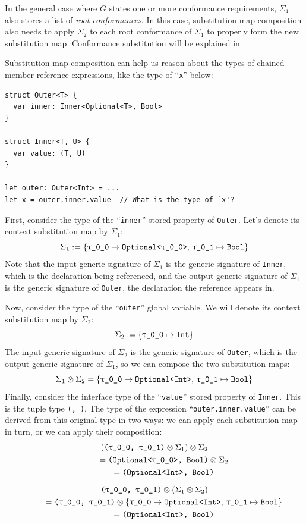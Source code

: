 \documentclass[../generics]{subfiles}
\begin{document}
In the general case where $G$ states one or more conformance requirements, $\Sigma_1$ also stores a list of \emph{root conformances}. In this case, substitution map composition also needs to apply $\Sigma_2$ to each root conformance of $\Sigma_1$ to properly form the new substitution map. Conformance substitution will be explained in .

\newcommand{\FirstMapInExample}{\SubstMap{
\SubstType{\rT}{Optional<\rT>},\,\SubstType{\rU}{Bool}
}}
\newcommand{\SecondMapInExample}{\SubstMap{
\SubstType{\rT}{Int}
}}
\newcommand{\ThirdMapInExample}{\SubstMap{
\SubstType{\rT}{Optional<Int>},\,\SubstType{\rU}{Bool}
}}

\begin{example}\label{composesubstmapexample}
Substitution map composition can help us reason about the types of chained member reference expressions, like the type of ``\texttt{x}'' below:
\begin{Verbatim}
struct Outer<T> {
  var inner: Inner<Optional<T>, Bool>
}

struct Inner<T, U> {
  var value: (T, U)
}

let outer: Outer<Int> = ...
let x = outer.inner.value  // What is the type of `x'?
\end{Verbatim}
First, consider the type of the ``\texttt{inner}'' stored property of \texttt{Outer}. Let's denote its context substitution map by $\Sigma_1$:
\[
\Sigma_1 := \FirstMapInExample
\]
Note that the input generic signature of $\Sigma_1$ is the generic signature of \texttt{Inner}, which is the declaration being referenced, and the output generic signature of $\Sigma_1$ is the generic signature of \texttt{Outer}, the declaration the reference appears in.

Now, consider the type of the ``\texttt{outer}'' global variable. We will denote its context substitution map by $\Sigma_2$:
\[
\Sigma_2 := \SecondMapInExample
\]
The input generic signature of $\Sigma_2$ is the generic signature of \texttt{Outer}, which is the output generic signature of $\Sigma_1$, so we can compose the two substitution maps:
\[\Sigma_1\otimes\Sigma_2 = \ThirdMapInExample\]
Finally, consider the interface type of the ``\texttt{value}'' stored property of \texttt{Inner}. This is the tuple type \texttt{(\rT, \rU)}. The type of the expression ``\texttt{outer.inner.value}'' can be derived from this original type in two ways: we can apply each substitution map in turn, or we can apply their composition:
\begin{gather*}
(\texttt{(\rT, \rU)}\otimes\Sigma_1)\otimes \Sigma_2\\
\qquad {} = \texttt{(Optional<\rT>, Bool)}\otimes \Sigma_2\\
\qquad {} = \texttt{(Optional<Int>, Bool)}\\[\medskipamount]
\texttt{(\rT, \rU)}\otimes(\Sigma_1\otimes \Sigma_2)\\
\qquad {} = \texttt{(\rT, \rU)}\otimes \ThirdMapInExample\\
\qquad {} = \texttt{(Optional<Int>, Bool)}
\end{gather*}
\end{example}
\end{document}
